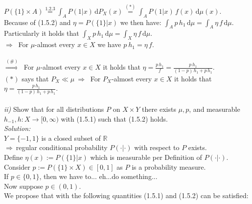 \documentclass{article}
\begin{document}
\vspace*{-1em} \\
\indent $P(\{ 1\} \times A) \overset{1.2.3}{=} \displaystyle{ \int_{A} P({1}| x)\, \text{d}P_X(x) \overset{(*)}{=} \int_{A} P({1}| x)\, f(x)\, \text{d}\mu(x)  }  $.\vspace*{0.3em}\\
Because of (1.5.2) and $\eta=P(\{ 1\}|x)$ we then have: $\displaystyle{ \int_{A} p\,h_1\, \text{d}\mu =\int_A \eta \, f \, \text{d}\mu  }$.\vspace*{0.1em}\\
Particularly it holds that $\displaystyle{ \int_{X} p\,h_1\, \text{d}\mu =\int_X \eta \, f \, \text{d}\mu  }$.\vspace*{0.7em}\\
$\Rightarrow \ $ For $\mu$-almost every $x\in X$ we have $\displaystyle{ p\ h_1 = \eta \, f } $. \\
\vspace*{-1em} \\
$\overset{(\#)}{\Rightarrow} \ $ For $\mu$-almost every $x\in X$ it holds that $\displaystyle{ \eta = \frac{p\, h_1}{f} = \frac{p \, h_1}{(1-p)\,h_1 + p\, h_1} }$.\\
$(*)$ says that $P_X \ll \mu \ \Rightarrow \ $ For $P_X$-almost every $x\in X$ it holds that $\displaystyle{ \eta = \frac{p \, h_1}{(1-p)\,h_1 + p\, h_1} }$.\\
\\
\textsl{ii)} Show that for all distributions $P$ on $X\times Y$ there exists $\mu, p$, and measurable $h_{-1}, h: X \rightarrow [0,\infty)$ with (1.5.1) such that (1.5.2) holds. \vspace{0.5em}\\
\textsl{Solution:} \\
$Y=\{-1,1\}$ is a closed subset of $\mathbb{R} \ $\\
$\Rightarrow \ $regular conditional probability $P(\cdot | \cdot )$ with respect to $P$ exists.  \\
Define $\eta(x):=P(\{1\}|x)$ which is measurable per Definition of $P(\cdot | \cdot )$. \\
Consider $p:=P(\{1\} \times X) \in [0,1]$ as $P$ is a probability measure. \\
If $p \in \{0,1\}$, then we have to... eh...do something... \\
Now suppose $p \in (0,1)$. \\
We propose that with the following quantities  (1.5.1) and (1.5.2) can be satisfied: \\
\end{document}
